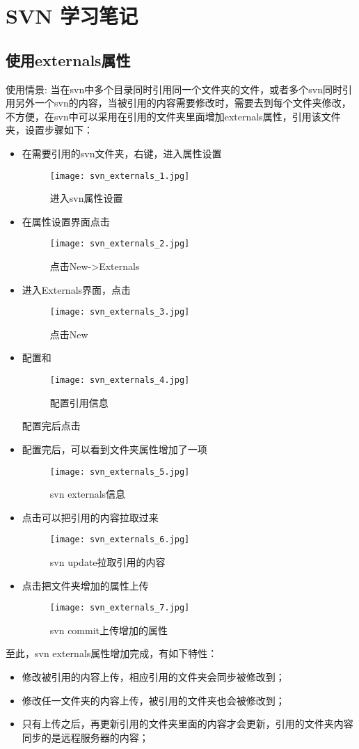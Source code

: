 \section{SVN 学习笔记}
\subsection{使用externals属性}
使用情景: 当在svn中多个目录同时引用同一个文件夹的文件，或者多个svn同时引用另外一个svn的内容，当被引用的内容需要修改时，需要去到每个文件夹修改，不方便，在svn中可以采用在引用的文件夹里面增加externals属性，引用该文件夹，设置步骤如下：
\begin{itemize}
\item 在需要引用的svn文件夹，右键，进入属性设置
\begin{figure}[H]
\centering
\texttt{[image: svn\_externals\_1.jpg]}
\caption{进入svn属性设置}
\end{figure}

\item 在属性设置界面点击
\begin{figure}[H]
\centering
\texttt{[image: svn\_externals\_2.jpg]}
\caption{点击New->Externals}
\end{figure}

\item 进入Externals界面，点击
\begin{figure}[H]
\centering
\texttt{[image: svn\_externals\_3.jpg]}
\caption{点击New}
\end{figure}

\item 配置和
\begin{figure}[H]
\centering
\texttt{[image: svn\_externals\_4.jpg]}
\caption{配置引用信息}
\end{figure}
配置完后点击

\item 配置完后，可以看到文件夹属性增加了一项
\begin{figure}[H]
\centering
\texttt{[image: svn\_externals\_5.jpg]}
\caption{svn externals信息}
\end{figure}


\item 点击可以把引用的内容拉取过来
\begin{figure}[H]
\centering
\texttt{[image: svn\_externals\_6.jpg]}
\caption{svn update拉取引用的内容}
\end{figure}

\item 点击把文件夹增加的属性上传
\begin{figure}[H]
\centering
\texttt{[image: svn\_externals\_7.jpg]}
\caption{svn commit上传增加的属性}
\end{figure}

\end{itemize}

至此，svn externals属性增加完成，有如下特性：
\begin{itemize}
\item 修改被引用的内容上传，相应引用的文件夹会同步被修改到；
\item 修改任一文件夹的内容上传，被引用的文件夹也会被修改到；
\item 只有上传之后，再更新引用的文件夹里面的内容才会更新，引用的文件夹内容同步的是远程服务器的内容；
\end{itemize}

